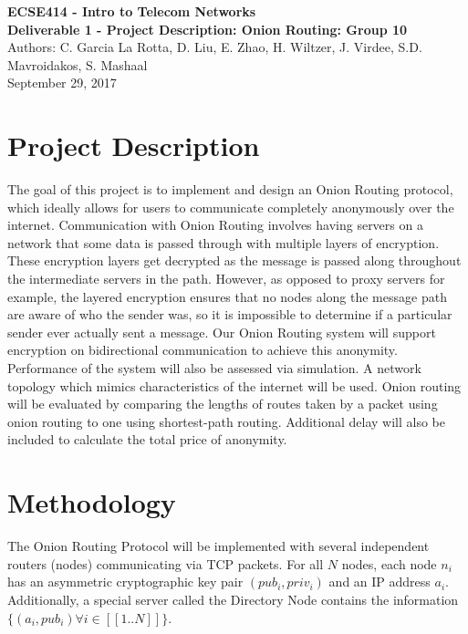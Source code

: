 \documentclass[10pt]{article}
\begin{document}
\noindent
\large \textbf{ECSE414 - Intro to Telecom Networks\\Deliverable 1 - Project Description: Onion Routing: Group 10}\\
Authors: C. Garcia La Rotta, D. Liu, E. Zhao, H. Wiltzer, J. Virdee, S.D. Mavroidakos, S. Mashaal\\
September 29, 2017

\section*{Project Description}

The goal of this project is to implement and design an Onion Routing protocol,
which ideally allows for users to communicate completely anonymously over the
internet. Communication with Onion Routing involves having servers on a network that some
data is passed through with multiple layers of encryption. These encryption layers get decrypted as
the message is passed along throughout the intermediate servers in the path.
However, as opposed to proxy servers for example,
the layered encryption ensures that no nodes along the
message path are aware of who the sender was, so it is impossible to determine
if a particular sender ever actually sent a message. Our Onion Routing
system will support encryption on bidirectional communication to achieve this
anonymity.\\

\noindent Performance of the system will also be assessed via simulation. A network topology which mimics characteristics of the internet will be used. Onion routing will be evaluated by comparing the lengths of routes taken by a packet using onion routing to one using shortest-path routing. Additional delay will also be included to calculate the total price of anonymity.


\section*{Methodology}

The Onion Routing Protocol will be implemented with several independent routers (nodes)
communicating via TCP packets.  For all $N$ nodes, each node $n_i$ has
an asymmetric cryptographic key pair $(pub_{i},priv_{i})$ and an IP address $a_i$.  Additionally, a special
server called the Directory Node contains the information $\{(a_i, pub_i) \forall i \in [\![1..N]\!]\}$.\\
\end{document}
